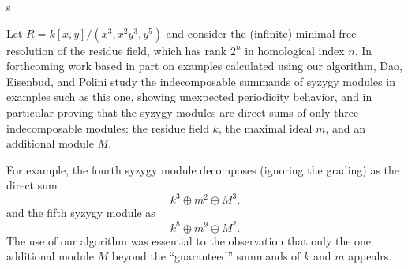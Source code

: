 s\documentclass{article}
\numberwithin{equation}{section}
\theoremstyle{theorem}
\numberwithin{thm}{section}
\theoremstyle{definition}
\begin{document}
\begin{exa}
  Let $R = k[x,y]/(x^3,x^2y^3,y^5)$ and consider the (infinite) minimal free resolution of the residue field, which has rank $2^n$ in homological index $n$. In forthcoming work based in part on examples calculated using our algorithm, Dao, Eisenbud, and Polini study the indecomposable summands of syzygy modules in examples such as this one, showing unexpected periodicity behavior, and in particular proving that the syzygy modules are direct sums of only three indecomposable modules: the residue field $k$, the maximal ideal $m$, and an additional module $M$. 

  For example, the fourth syzygy module decomposes (ignoring the grading) as the direct sum
  $$ k^3 \oplus m^2 \oplus M^3. $$
  and the fifth syzygy module as 
  $$ k^8\oplus m^9 \oplus M^2. $$
  The use of our algorithm was essential to the observation that only the one additional module $M$ beyond the ``guaranteed'' summands of $k$ and $m$ appealrs.
\end{exa}



\end{document}
